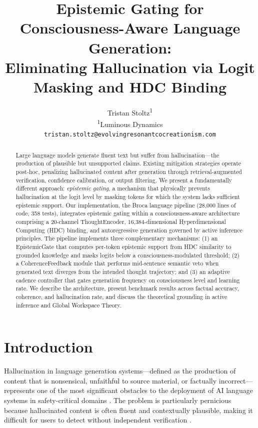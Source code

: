 \documentclass[12pt,a4paper]{article}
\title{Epistemic Gating for Consciousness-Aware Language Generation:\\Eliminating Hallucination via Logit Masking and HDC Binding}
\author{
  Tristan Stoltz\textsuperscript{1} \\
  \textsuperscript{1}Luminous Dynamics \\
  \texttt{tristan.stoltz@evolvingresonantcocreationism.com}
}
\date{}
\begin{document}
\maketitle

\begin{abstract}
Large language models generate fluent text but suffer from hallucination---the production of plausible but unsupported claims. Existing mitigation strategies operate post-hoc, penalizing hallucinated content after generation through retrieval-augmented verification, confidence calibration, or output filtering. We present a fundamentally different approach: \emph{epistemic gating}, a mechanism that physically prevents hallucination at the logit level by masking tokens for which the system lacks sufficient epistemic support. Our implementation, the Broca language pipeline (28,000 lines of code, 358 tests), integrates epistemic gating within a consciousness-aware architecture comprising a 20-channel ThoughtEncoder, 16,384-dimensional Hyperdimensional Computing (HDC) binding, and autoregressive generation governed by active inference principles. The pipeline implements three complementary mechanisms: (1) an EpistemicGate that computes per-token epistemic support from HDC similarity to grounded knowledge and masks logits below a consciousness-modulated threshold; (2) a CoherenceFeedback module that performs mid-sentence semantic veto when generated text diverges from the intended thought trajectory; and (3) an adaptive cadence controller that gates generation frequency on consciousness level and learning rate. We describe the architecture, present benchmark results across factual accuracy, coherence, and hallucination rate, and discuss the theoretical grounding in active inference and Global Workspace Theory.
\end{abstract}

\section{Introduction}

Hallucination in language generation systems---defined as the production of content that is nonsensical, unfaithful to source material, or factually incorrect---represents one of the most significant obstacles to the deployment of AI language systems in safety-critical domains \citep{ji2023survey, maynez2020faithfulness}. The problem is particularly pernicious because hallucinated content is often fluent and contextually plausible, making it difficult for users to detect without independent verification \citep{lin2022truthfulqa}.
\end{document}

